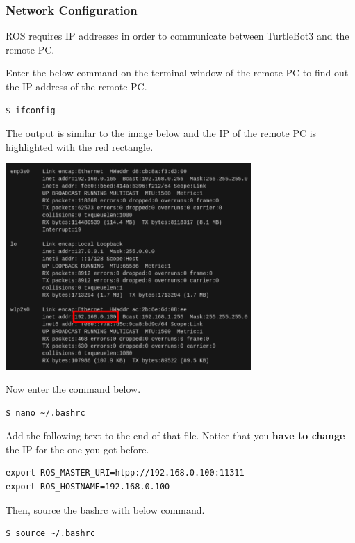 \documentclass{article}
\begin{document}
\subsubsection{Network Configuration}

ROS requires IP addresses in order to communicate between TurtleBot3 and the remote PC.

Enter the below command on the terminal window of the remote PC to find out the IP address of the remote PC.

\begin{verbatim}
$ ifconfig
\end{verbatim}

The output is similar to the image below and the IP of the remote PC is highlighted with the red rectangle.

\bigskip

\includegraphics[width=0.7\textwidth]{network_configuration2}

\newpage

Now enter the command below.

\begin{verbatim}
$ nano ~/.bashrc
\end{verbatim}

Add the following text to the end of that file. Notice that you \textbf{have to change} the IP for the one you got before.

\begin{verbatim}
export ROS_MASTER_URI=htpp://192.168.0.100:11311
export ROS_HOSTNAME=192.168.0.100
\end{verbatim}

Then, source the bashrc with below command.

\begin{verbatim}
$ source ~/.bashrc
\end{verbatim}
\end{document}
